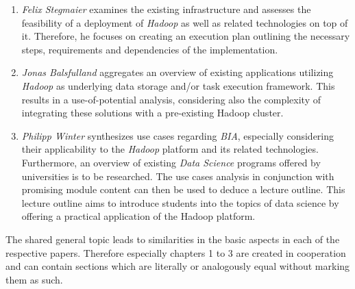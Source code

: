 \begin{enumerate}
	\item \emph{Felix Stegmaier} examines the existing infrastructure and assesses the feasibility of a deployment of \emph{Hadoop} as well as related technologies on top of it. Therefore, he focuses on creating an execution plan outlining the necessary steps, requirements and dependencies of the implementation.
	\item \emph{Jonas Balsfulland} aggregates an overview of existing applications utilizing \emph{Hadoop} as underlying data storage and/or task execution framework. This results in a use-of-potential analysis, considering also the complexity of integrating these solutions with a pre-existing Hadoop cluster.
	\item \emph{Philipp Winter} synthesizes use cases regarding \emph{\ac{BIA}}, especially considering their applicability to the \emph{Hadoop} platform and its related technologies. Furthermore, an overview of existing \emph{Data Science} programs offered by universities is to be researched. The use cases analysis in conjunction with promising module content can then be used to deduce a lecture outline. This lecture outline aims to introduce students into the topics of data science by offering a practical application of the Hadoop platform.
\end{enumerate}

The shared general topic leads to similarities in the basic aspects in each of the respective papers.
Therefore especially chapters 1 to 3 are created in cooperation 
and can contain sections which are literally or analogously equal without marking them as such.
